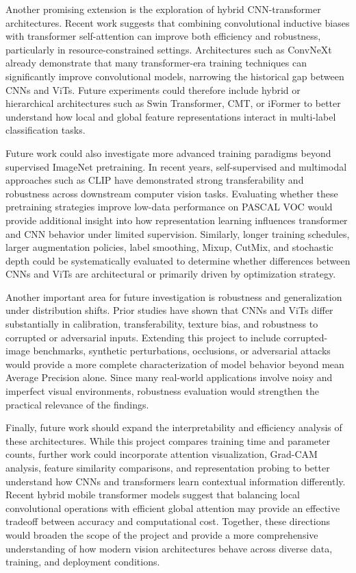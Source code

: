 \documentclass{article}
\begin{document}
Another promising extension is the exploration of hybrid CNN-transformer architectures. Recent work suggests that combining convolutional inductive biases with transformer self-attention can improve both efficiency and robustness, particularly in resource-constrained settings. Architectures such as ConvNeXt already demonstrate that many transformer-era training techniques can significantly improve convolutional models, narrowing the historical gap between CNNs and ViTs. Future experiments could therefore include hybrid or hierarchical architectures such as Swin Transformer, CMT, or iFormer to better understand how local and global feature representations interact in multi-label classification tasks.

Future work could also investigate more advanced training paradigms beyond supervised ImageNet pretraining. In recent years, self-supervised and multimodal approaches such as CLIP have demonstrated strong transferability and robustness across downstream computer vision tasks. Evaluating whether these pretraining strategies improve low-data performance on PASCAL VOC would provide additional insight into how representation learning influences transformer and CNN behavior under limited supervision. Similarly, longer training schedules, larger augmentation policies, label smoothing, Mixup, CutMix, and stochastic depth could be systematically evaluated to determine whether differences between CNNs and ViTs are architectural or primarily driven by optimization strategy.

Another important area for future investigation is robustness and generalization under distribution shifts. Prior studies have shown that CNNs and ViTs differ substantially in calibration, transferability, texture bias, and robustness to corrupted or adversarial inputs. Extending this project to include corrupted-image benchmarks, synthetic perturbations, occlusions, or adversarial attacks would provide a more complete characterization of model behavior beyond mean Average Precision alone. Since many real-world applications involve noisy and imperfect visual environments, robustness evaluation would strengthen the practical relevance of the findings.

Finally, future work should expand the interpretability and efficiency analysis of these architectures. While this project compares training time and parameter counts, further work could incorporate attention visualization, Grad-CAM analysis, feature similarity comparisons, and representation probing to better understand how CNNs and transformers learn contextual information differently. Recent hybrid mobile transformer models suggest that balancing local convolutional operations with efficient global attention may provide an effective tradeoff between accuracy and computational cost. Together, these directions would broaden the scope of the project and provide a more comprehensive understanding of how modern vision architectures behave across diverse data, training, and deployment conditions.
\end{document}
